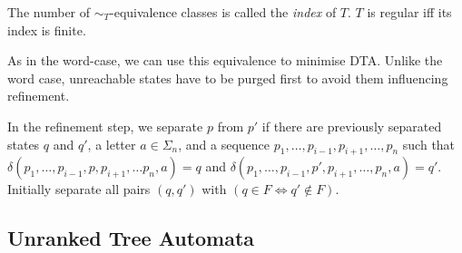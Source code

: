 \documentclass[english]{panikzettel}
\begin{document}
The number of ${\sim_T}$-equivalence classes is called the \emph{index} of $T$. $T$ is regular iff its index is finite.

As in the word-case, we can use this equivalence to minimise DTA. Unlike the word case, unreachable states have to be purged first to avoid them influencing refinement.

In the refinement step, we separate $p$ from $p'$ if there are previously separated states $q$ and $q'$, a letter $a \in \Sigma_n$, and a sequence $p_1,\ldots, p_{i-1}, p_{i+1}, \ldots, p_{n}$ such that $\delta(p_1,\ldots, p_{i-1} ,p, p_{i+1}, \ldots p_n, a) = q$ and $\delta(p_1,\ldots, p_{i-1} ,p', p_{i+1}, \ldots, p_n, a) = q'$. Initially separate all pairs $(q,q')$ with $(q \in F \Leftrightarrow q' \notin F)$.

\subsection{Unranked Tree Automata}
\end{document}
